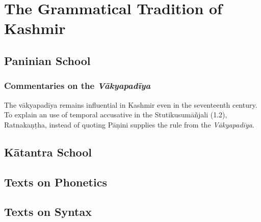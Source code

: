 \chapter{The Grammatical Tradition of Kashmir}

\section{Paninian School}

\subsection{Commentaries on the \emph{Vākyapadīya}}

The vākyapadīya remains influential in Kashmir even in the seventeenth century. To explain an use of temporal accusative in the Stutikusumāñjali (1.2), Ratnakaṇṭha, instead of quoting Pāṇini supplies the rule from the \emph{Vākyapadīya}.  

\section{Kātantra School}

\section{Texts on Phonetics}

\section{Texts on Syntax}